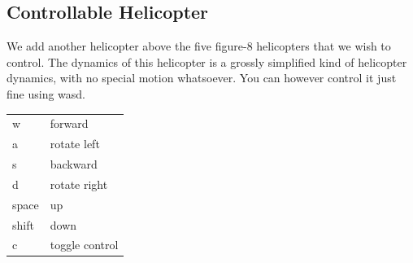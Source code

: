 \documentclass[]{article}
\begin{document}
\begin{multicols}{2}
\setcounter{section}{6}
\section{}
\setcounter{subsection}{1}
\subsection{Controllable Helicopter}
We add another helicopter above the five figure-8 helicopters that we wish to control. The dynamics of this helicopter is a grossly simplified kind of helicopter dynamics, with no special motion whatsoever. You can however control it just fine using wasd.

\begin{center}
\begin{tabular}{ |l|l| }
\hline
w & forward\\
a & rotate left\\
s & backward\\
d & rotate right\\
space & up\\
shift & down\\
c & toggle control\\
\hline
\end{tabular}
\end{center}


\end{multicols}
\end{document}

